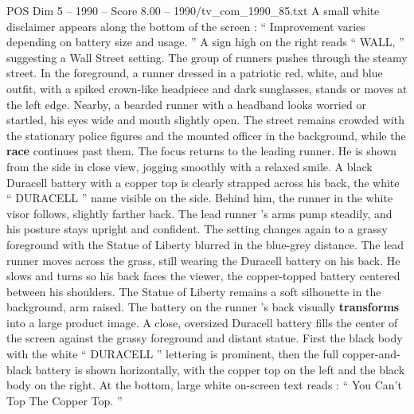 \begin{textsample}{POS Dim 5 – 1990 – Score 8.00 – 1990/tv\_com\_1990\_85.txt}
A small white disclaimer appears along the bottom of the screen : “ Improvement varies depending on battery size and usage. ” A sign high on the right reads “ WALL, ” suggesting a Wall Street setting.
The group of runners pushes through the steamy street.
In the foreground, a runner dressed in a patriotic red, white, and blue outfit, with a spiked crown-like headpiece and dark sunglasses, stands or moves at the left edge.
Nearby, a bearded runner with a headband looks worried or startled, his eyes wide and mouth slightly open.
The street remains crowded with the stationary police figures and the mounted officer in the background, while the \textbf{race} continues past them.
The focus returns to the leading runner.
He is shown from the side in close view, jogging smoothly with a relaxed smile.
A black Duracell battery with a copper top is clearly strapped across his back, the white “ DURACELL ” name visible on the side.
Behind him, the runner in the white visor follows, slightly farther back.
The lead runner ’s arms pump steadily, and his posture stays upright and confident.
The setting changes again to a grassy foreground with the Statue of Liberty blurred in the blue-grey distance.
The lead runner moves across the grass, still wearing the Duracell battery on his back.
He slows and turns so his back faces the viewer, the copper-topped battery centered between his shoulders.
The Statue of Liberty remains a soft silhouette in the background, arm raised.
The battery on the runner ’s back visually \textbf{transforms} into a large product image.
A close, oversized Duracell battery fills the center of the screen against the grassy foreground and distant statue.
First the black body with the white “ DURACELL ” lettering is prominent, then the full copper-and-black battery is shown horizontally, with the copper top on the left and the black body on the right.
At the bottom, large white on-screen text reads : “ You Can't Top The Copper Top. ”

\end{textsample}
